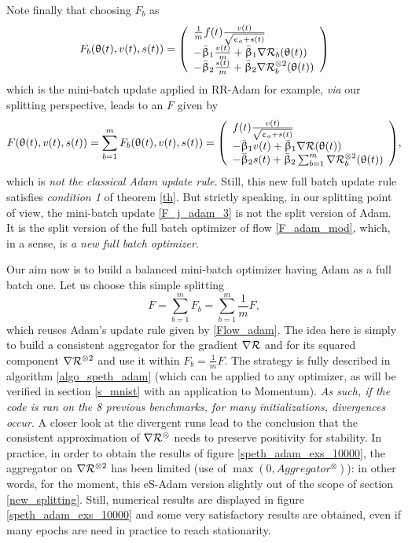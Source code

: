 \documentclass[article,authoryear,jmlmc]{beg_32}             %
\begin{document}
Note finally that choosing $F_b$ as
\begin{eqnarray}
\label{F_j_adam_3}
F_b(\theta(t),v(t),s(t))=\left(\begin{array}{l}
  \frac{1}{m}f(t) \frac{v(t)}{\sqrt{\epsilon_a+s(t)}}\\
     -\bar{\beta}_1 \frac{v(t)}{m}+\bar{\beta}_1\nR_b(\theta(t))\\
     -\bar{\beta}_2 \frac{s(t)}{m}+\bar{\beta}_2\nR_b^{\otimes 2}(\theta(t))\\
  \end{array}\right)
\end{eqnarray}
which is the mini-batch update applied in RR-Adam for example, {\em via} our splitting perspective, 
leads to an $F$ given by 
\begin{eqnarray}
\label{F_adam_mod}
  F(\theta(t),v(t),s(t))=\sum_{b=1}^m F_b(\theta(t),v(t),s(t))=\left(\begin{array}{l}
  f(t) \frac{v(t)}{\sqrt{\epsilon_a+s(t)}}\\
     -\bar{\beta}_1 {v(t)}+\bar{\beta}_1\nR(\theta(t))\\
     -\bar{\beta}_2 {s(t)}+\bar{\beta}_2\sum_{b=1}^m \nR_b^{\otimes 2}(\theta(t))\\
  \end{array}\right),
\end{eqnarray}
which is {\em not the classical Adam update rule}. Still, this new full batch update rule satisfies
{\em condition 1} of theorem \ref{th}. But strictly speaking, in our splitting point of view, the mini-batch update \eqref{F_j_adam_3} is not the split version of Adam. 
It is the split version of the full batch optimizer of flow \eqref{F_adam_mod}, which, in a sense, is {\em a new full batch optimizer}.  

Our aim now is to build a balanced mini-batch optimizer having Adam as a full batch one. 
Let us choose this simple splitting
$$
F = \sum_{b=1}^m F_b = \sum_{b=1}^m \frac{1}{m}F,
$$
which reuses Adam's update rule given by \eqref{Flow_adam}. 
The idea here is simply to build a consistent aggregator for the gradient $\nabla \mathcal{R}$ and for its squared component $\nabla \mathcal{R}^{\otimes 2}$ and use it within $F_b=\frac{1}{m}F$. 
The strategy is fully described in algorithm \ref{algo_speth_adam} (which can be applied to any optimizer, as will be verified in section \ref{s_mnist} with an application to Momentum).
{\em As such, if the code is ran on the 8 previous benchmarks, for many initializations, divergences occur}. 
A closer look at the divergent runs lead to the conclusion that the consistent approximation of $\nabla \mathcal{R}^{\otimes}$ needs to preserve positivity for stability. 
In practice, in order to obtain the results of figure \ref{speth_adam_exs_10000}, the aggregator on $\nabla \mathcal{R}^{\otimes 2}$ has been limited (use of $\max(0, Aggregator^{\otimes})$): in
other words, for the moment, this eS-Adam version slightly out of the scope of section \ref{new_splitting}. Still, numerical results are displayed in figure
\ref{speth_adam_exs_10000} and some very satisfactory results are obtained, even if many epochs are need in practice to reach stationarity. \\ 
\end{document}
